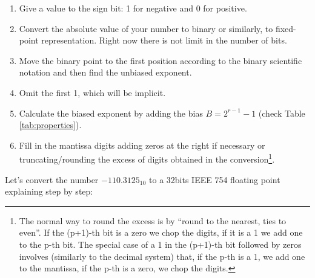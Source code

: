 \begin{enumerate}
    \item Give a value to the sign bit: 1 for negative and 0 for positive.
    
    \item Convert the absolute value of your number to binary or similarly, to fixed-point representation. Right now there is not limit in the number of bits. 
      
    \item Move the binary point to the first position according to the binary scientific notation and then find the unbiased exponent.
    
    \item Omit the first 1, which will be implicit.
    
    \item Calculate the biased exponent by adding the bias $B = 2^{r-1}-1$ (check Table \ref{tab:properties}).
    
    \item Fill in the mantissa digits adding zeros at the right if necessary or truncating/rounding the excess of digits obtained in the conversion\footnote{The normal way to round the excess is by ``round to the nearest, ties to even''. If the (p+1)-th bit is a zero we chop the digits, if it is a 1 we add one to the p-th bit. The special case of a 1 in the (p+1)-th bit followed by zeros involves (similarly to the decimal system) that, if the p-th is a 1, we add one to the mantissa, if the p-th is a zero, we chop the digits.}.
\end{enumerate}




Let's convert the number $-110.3125_{10}$ to a 32bits IEEE 754 floating point explaining step by step:

